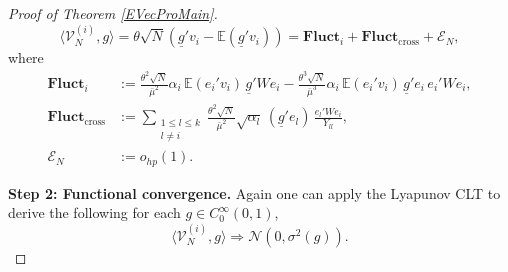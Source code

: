 \documentclass[11pt, reqno]{amsart}
\numberwithin{equation}{section}
\begin{document}
\begin{proof}[Proof of Theorem \ref{EVecProMain}]
\begin{equation}\label{eq:VN.fluctuation.decomp}
\langle \mathcal V_N^{(i)}, g \rangle 
= \theta \sqrt{N} \left( \underline{g}' v_i - \mathbb{E}(\underline{g}' v_i) \right) 
= \mathbf{Fluct}_i + \mathbf{Fluct}_{\text{cross}} + \mathcal{E}_N,
\end{equation}
where
\begin{align*}
\mathbf{Fluct}_i 
&:= \frac{\theta^2 \sqrt{N}}{\bar{\mu}^2} \alpha_i\, \mathbb{E}(e_i' v_i)\, \underline{g}' W e_i 
- \frac{\theta^3 \sqrt{N}}{\bar{\mu}^3} \alpha_i\, \mathbb{E}(e_i' v_i)\, \underline{g}' e_i\, e_i' W e_i, \\
\mathbf{Fluct}_{\text{cross}} 
&:= \sum_{\substack{1 \le l \le k \\ l \ne i}} \frac{\theta^2 \sqrt{N}}{\bar{\mu}^2} \sqrt{\alpha_l}\, (\underline{g}' e_l)\, \frac{e_l' W e_i}{Y_{ll}}, \\
\mathcal{E}_N 
&:= o_{hp}\left(1\right).
\end{align*}


\noindent\textbf{Step 2: Functional convergence.}
Again one can apply the Lyapunov CLT to derive the following for each $g \in C_0^\infty(0,1)$,
\[
\langle \mathcal V^{(i)}_N, g \rangle \Rightarrow \mathcal{N}(0, \sigma^2(g)).
\]


\end{proof}
\end{document}
